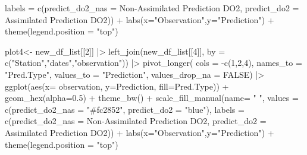 \documentclass[
  letterpaper,
  DIV=11,
  numbers=noendperiod,
  abstract]{scrartcl}
\newenvironment{Shaded}{\begin{snugshade}}{\end{snugshade}}
\newcommand{\AttributeTok}[1]{\textcolor[rgb]{0.40,0.45,0.13}{#1}}
\newcommand{\ConstantTok}[1]{\textcolor[rgb]{0.56,0.35,0.01}{#1}}
\newcommand{\DecValTok}[1]{\textcolor[rgb]{0.68,0.00,0.00}{#1}}
\newcommand{\FloatTok}[1]{\textcolor[rgb]{0.68,0.00,0.00}{#1}}
\newcommand{\FunctionTok}[1]{\textcolor[rgb]{0.28,0.35,0.67}{#1}}
\newcommand{\NormalTok}[1]{\textcolor[rgb]{0.00,0.23,0.31}{#1}}
\newcommand{\OtherTok}[1]{\textcolor[rgb]{0.00,0.23,0.31}{#1}}
\newcommand{\SpecialCharTok}[1]{\textcolor[rgb]{0.37,0.37,0.37}{#1}}
\newcommand{\StringTok}[1]{\textcolor[rgb]{0.13,0.47,0.30}{#1}}
\begin{document}
\begin{Shaded}
\begin{Highlighting}[]
    \AttributeTok{labels =} \FunctionTok{c}\NormalTok{(}\StringTok{\textquotesingle{}predict\_do2\_nas\textquotesingle{}} \OtherTok{=} \StringTok{\textquotesingle{}Non{-}Assimilated Prediction DO2\textquotesingle{}}\NormalTok{,}
               \StringTok{\textquotesingle{}predict\_do2\textquotesingle{}} \OtherTok{=} \StringTok{\textquotesingle{}Assimilated Prediction DO2\textquotesingle{}}\NormalTok{)) }\SpecialCharTok{+}
  \FunctionTok{labs}\NormalTok{(}\AttributeTok{x=}\StringTok{"Observation"}\NormalTok{,}\AttributeTok{y=}\StringTok{"Prediction"}\NormalTok{) }\SpecialCharTok{+} \FunctionTok{theme}\NormalTok{(}\AttributeTok{legend.position =} \StringTok{"top"}\NormalTok{)}

\NormalTok{plot4}\OtherTok{\textless{}{-}} 
\NormalTok{new\_df\_list[[}\DecValTok{2}\NormalTok{]] }\SpecialCharTok{|\textgreater{}}
  \FunctionTok{left\_join}\NormalTok{(new\_df\_list[[}\DecValTok{4}\NormalTok{]], }\AttributeTok{by =} \FunctionTok{c}\NormalTok{(}\StringTok{"Station"}\NormalTok{,}\StringTok{"dates"}\NormalTok{,}\StringTok{"observation"}\NormalTok{)) }\SpecialCharTok{|\textgreater{}}
    \FunctionTok{pivot\_longer}\NormalTok{(}
       \AttributeTok{cols =} \SpecialCharTok{{-}}\FunctionTok{c}\NormalTok{(}\DecValTok{1}\NormalTok{,}\DecValTok{2}\NormalTok{,}\DecValTok{4}\NormalTok{),}
       \AttributeTok{names\_to =} \StringTok{"Pred.Type"}\NormalTok{,}
       \AttributeTok{values\_to =} \StringTok{"Prediction"}\NormalTok{,}
       \AttributeTok{values\_drop\_na =} \ConstantTok{FALSE}\NormalTok{) }\SpecialCharTok{|\textgreater{}}
\FunctionTok{ggplot}\NormalTok{(}\FunctionTok{aes}\NormalTok{(}\AttributeTok{x=}\NormalTok{ observation, }\AttributeTok{y=}\NormalTok{Prediction, }\AttributeTok{fill=}\NormalTok{Pred.Type)) }\SpecialCharTok{+} 
  \FunctionTok{geom\_hex}\NormalTok{(}\AttributeTok{alpha=}\FloatTok{0.5}\NormalTok{) }\SpecialCharTok{+}     \FunctionTok{theme\_bw}\NormalTok{() }\SpecialCharTok{+}
  \FunctionTok{scale\_fill\_manual}\NormalTok{(}\AttributeTok{name=} \StringTok{" "}\NormalTok{,}
           \AttributeTok{values =} \FunctionTok{c}\NormalTok{(}\StringTok{\textquotesingle{}predict\_do2\_nas\textquotesingle{}} \OtherTok{=} \StringTok{"\#fc2852"}\NormalTok{,}
                      \StringTok{\textquotesingle{}predict\_do2\textquotesingle{}} \OtherTok{=} \StringTok{"blue"}\NormalTok{),}
           \AttributeTok{labels =} \FunctionTok{c}\NormalTok{(}\StringTok{\textquotesingle{}predict\_do2\_nas\textquotesingle{}} \OtherTok{=} \StringTok{\textquotesingle{}Non{-}Assimilated Prediction DO2\textquotesingle{}}\NormalTok{,}
                      \StringTok{\textquotesingle{}predict\_do2\textquotesingle{}} \OtherTok{=} \StringTok{\textquotesingle{}Assimilated Prediction DO2\textquotesingle{}}\NormalTok{)) }\SpecialCharTok{+}
  \FunctionTok{labs}\NormalTok{(}\AttributeTok{x=}\StringTok{"Observation"}\NormalTok{,}\AttributeTok{y=}\StringTok{"Prediction"}\NormalTok{) }\SpecialCharTok{+} \FunctionTok{theme}\NormalTok{(}\AttributeTok{legend.position =} \StringTok{"top"}\NormalTok{)}


\end{Highlighting}
\end{Shaded}
\end{document}
